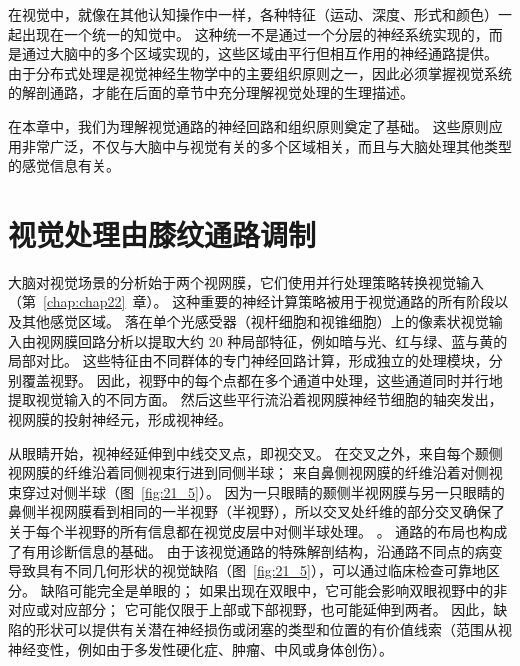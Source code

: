 在视觉中，就像在其他认知操作中一样，各种特征（运动、深度、形式和颜色）一起出现在一个统一的知觉中。
这种统一不是通过一个分层的神经系统实现的，而是通过大脑中的多个区域实现的，这些区域由平行但相互作用的神经通路提供。
由于分布式处理是视觉神经生物学中的主要组织原则之一，因此必须掌握视觉系统的解剖通路，才能在后面的章节中充分理解视觉处理的生理描述。


在本章中，我们为理解视觉通路的神经回路和组织原则奠定了基础。
这些原则应用非常广泛，不仅与大脑中与视觉有关的多个区域相关，而且与大脑处理其他类型的感觉信息有关。



\section{视觉处理由膝纹通路调制}

大脑对视觉场景的分析始于两个视网膜，它们使用并行处理策略转换视觉输入（第~\ref{chap:chap22}~章）。
这种重要的神经计算策略被用于视觉通路的所有阶段以及其他感觉区域。
落在单个光感受器（视杆细胞和视锥细胞）上的像素状视觉输入由视网膜回路分析以提取大约 20 种局部特征，例如暗与光、红与绿、蓝与黄的局部对比。
这些特征由不同群体的专门神经回路计算，形成独立的处理模块，分别覆盖视野。
因此，视野中的每个点都在多个通道中处理，这些通道同时并行地提取视觉输入的不同方面。
然后这些平行流沿着视网膜神经节细胞的轴突发出，视网膜的投射神经元，形成视神经。


从眼睛开始，视神经延伸到中线交叉点，即视交叉。
在交叉之外，来自每个颞侧视网膜的纤维沿着同侧视束行进到同侧半球；
来自鼻侧视网膜的纤维沿着对侧视束穿过对侧半球（图~\ref{fig:21_5}）。
因为一只眼睛的颞侧半视网膜与另一只眼睛的鼻侧半视网膜看到相同的一半视野（半视野），所以交叉处纤维的部分交叉确保了关于每个半视野的所有信息都在视觉皮层中对侧半球处理。 。
通路的布局也构成了有用诊断信息的基础。
由于该视觉通路的特殊解剖结构，沿通路不同点的病变导致具有不同几何形状的视觉缺陷（图~\ref{fig:21_5}），可以通过临床检查可靠地区分。
缺陷可能完全是单眼的；
如果出现在双眼中，它可能会影响双眼视野中的非对应或对应部分；
它可能仅限于上部或下部视野，也可能延伸到两者。
因此，缺陷的形状可以提供有关潜在神经损伤或闭塞的类型和位置的有价值线索（范围从视神经变性，例如由于多发性硬化症、肿瘤、中风或身体创伤）。


